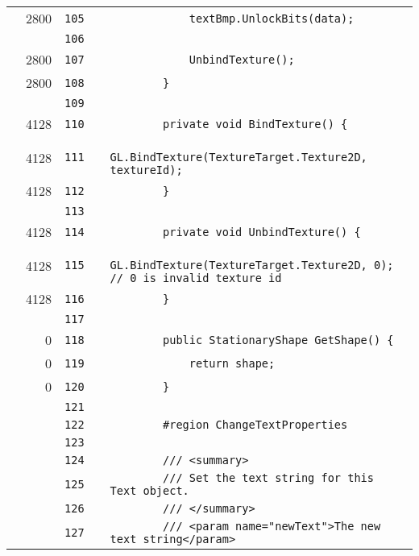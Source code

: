 \documentclass[a4paper,landscape,10pt]{article}
\begin{document}
\begin{longtable}[l]{lrrll}
\cellcolor{green} & 2800 & \verb~105~ & & \verb~            textBmp.UnlockBits(data);~\\
\cellcolor{gray} &  & \verb~106~ & & \verb~~\\
\cellcolor{green} & 2800 & \verb~107~ & & \verb~            UnbindTexture();~\\
\cellcolor{green} & 2800 & \verb~108~ & & \verb~        }~\\
\cellcolor{gray} &  & \verb~109~ & & \verb~~\\
\cellcolor{green} & 4128 & \verb~110~ & & \verb~        private void BindTexture() {~\\
\cellcolor{green} & 4128 & \verb~111~ & & \verb~            GL.BindTexture(TextureTarget.Texture2D, textureId);~\\
\cellcolor{green} & 4128 & \verb~112~ & & \verb~        }~\\
\cellcolor{gray} &  & \verb~113~ & & \verb~~\\
\cellcolor{green} & 4128 & \verb~114~ & & \verb~        private void UnbindTexture() {~\\
\cellcolor{green} & 4128 & \verb~115~ & & \verb~            GL.BindTexture(TextureTarget.Texture2D, 0); // 0 is invalid texture id~\\
\cellcolor{green} & 4128 & \verb~116~ & & \verb~        }~\\
\cellcolor{gray} &  & \verb~117~ & & \verb~~\\
\cellcolor{red} & 0 & \verb~118~ & & \verb~        public StationaryShape GetShape() {~\\
\cellcolor{red} & 0 & \verb~119~ & & \verb~            return shape;~\\
\cellcolor{red} & 0 & \verb~120~ & & \verb~        }~\\
\cellcolor{gray} &  & \verb~121~ & & \verb~~\\
\cellcolor{gray} &  & \verb~122~ & & \verb~        #region ChangeTextProperties~\\
\cellcolor{gray} &  & \verb~123~ & & \verb~~\\
\cellcolor{gray} &  & \verb~124~ & & \verb~        /// <summary>~\\
\cellcolor{gray} &  & \verb~125~ & & \verb~        /// Set the text string for this Text object.~\\
\cellcolor{gray} &  & \verb~126~ & & \verb~        /// </summary>~\\
\cellcolor{gray} &  & \verb~127~ & & \verb~        /// <param name="newText">The new text string</param>~\\

\end{longtable}
\end{document}
